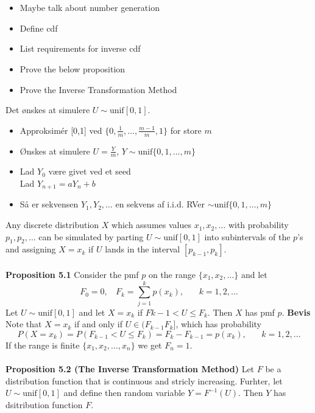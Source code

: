 \documentclass[12pt,a4paper]{report}
\author{Frederik Appel Vardinghus-Nielsen}
\begin{document}
\\\\
\begin{itemize}
\setlength\itemsep{0em}
\item Maybe talk about number generation
\item Define cdf
\item List requirements for inverse cdf
\item Prove the below proposition
\item Prove the Inverse Transformation Method
\end{itemize}
Det ønskes at simulere $U\sim\text{unif}[0,1]$.
\begin{itemize}
\item Approksimér [0,1] ved $\{0,\frac{1}{m},\ldots,\frac{m-1}{m},1\}$ for store $m$
\item Ønskes at simulere $U=\frac{Y}{m}$, $Y\sim\text{unif}\{0,1,\ldots,m\}$
\item Lad $Y_0$ være givet ved et seed\\
Lad $Y_{n+1}=aY_n+b$
\item Så er sekvensen $Y_1,Y_2,\ldots$ en sekvens af i.i.d. RVer $\sim\text{unif}\{0,1,\ldots,m\}$
\end{itemize}
Any discrete distribution $X$ which assumes values $x_1,x_2,\ldots$ with probability $p_1,p_2,\ldots$ can be simulated by parting $U\sim\text{unif}[0,1]$ into subintervals of the $p$'s and assigning $X=x_k$ if $U$ lands in the interval $[p_{k-1},p_k]$.\\\\
\textbf{Proposition 5.1} Consider the pmf $p$ on the range $\{x_1,x_2,\ldots\}$ and let
\begin{equation}
F_0=0,\phantom{m}F_k=\sum_{j=1}^kp(x_k),\phantom{mm}k=1,2,\ldots
\end{equation}
Let $U\sim\text{unif}[0,1]$ and let $X=x_k$ if $F{k-1}<U\leq F_k$. Then $X$ has pmf $p$.
\textbf{Bevis}\\
Note that $X=x_k$ if and only if $U\in (F_{k-1}F_k]$, which has probability
\begin{equation}
P(X=x_k)=P(F_{k-1}<U\leq F_k)=F_k-F_{k-1}=p(x_k),\phantom{mm}k=1,2,\ldots
\end{equation}
If the range is finite $\{x_1,x_2,\ldots,x_n\}$ we get $F_n=1$.\\\\
\textbf{Proposition 5.2 (The Inverse Transformation Method)} Let $F$ be a distribution function that is continuous and stricly increasing. Furhter, let $U\sim\text{unif}[0,1]$ and define then random variable $Y=F^{-1}(U)$. Then $Y$ has dsitribution function $F$.\\\\
\end{document}
